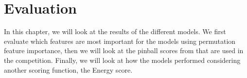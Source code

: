 \chapter{Evaluation}
\label{ch:Evaluation}

In this chapter, we will look at the results of the different models. 
We first evaluate which features are most important for the models using 
permutation feature importance, then we will look at the pinball scores from 
that are used in the competition. Finally, we will look at how the models performed 
considering another scoring function, the Energy score.





